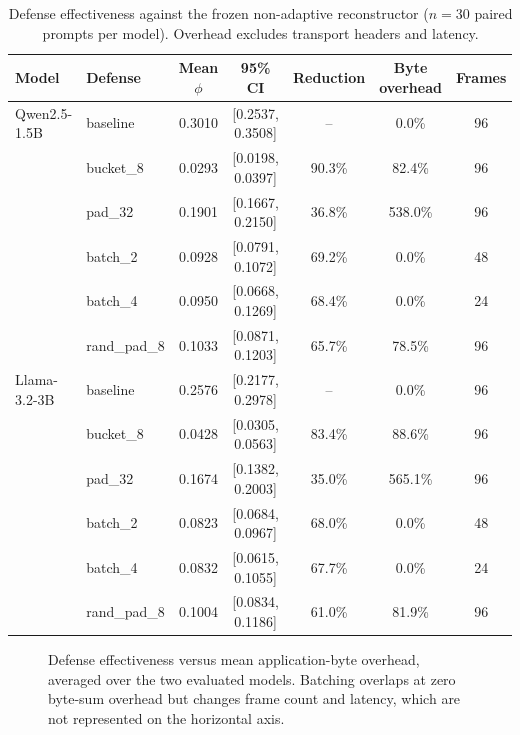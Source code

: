 \documentclass[journal,article,submit,pdftex,moreauthors]{Definitions/mdpi}
\begin{document}
\begin{table}[ht]
\centering
\caption{Defense effectiveness against the frozen non-adaptive reconstructor ($n=30$ paired prompts per model). Overhead excludes transport headers and latency.}
\label{tab:defense_results}
\begin{tabular}{l l c c c c c}
\toprule
Model & Defense & Mean $\phi$ & 95\% CI & Reduction & Byte overhead & Frames \\
\midrule
Qwen2.5-1.5B & baseline & 0.3010 & [0.2537, 0.3508] & -- & 0.0\% & 96 \\
 & bucket\_8 & 0.0293 & [0.0198, 0.0397] & 90.3\% & 82.4\% & 96 \\
 & pad\_32 & 0.1901 & [0.1667, 0.2150] & 36.8\% & 538.0\% & 96 \\
 & batch\_2 & 0.0928 & [0.0791, 0.1072] & 69.2\% & 0.0\% & 48 \\
 & batch\_4 & 0.0950 & [0.0668, 0.1269] & 68.4\% & 0.0\% & 24 \\
 & rand\_pad\_8 & 0.1033 & [0.0871, 0.1203] & 65.7\% & 78.5\% & 96 \\
\midrule
Llama-3.2-3B & baseline & 0.2576 & [0.2177, 0.2978] & -- & 0.0\% & 96 \\
 & bucket\_8 & 0.0428 & [0.0305, 0.0563] & 83.4\% & 88.6\% & 96 \\
 & pad\_32 & 0.1674 & [0.1382, 0.2003] & 35.0\% & 565.1\% & 96 \\
 & batch\_2 & 0.0823 & [0.0684, 0.0967] & 68.0\% & 0.0\% & 48 \\
 & batch\_4 & 0.0832 & [0.0615, 0.1055] & 67.7\% & 0.0\% & 24 \\
 & rand\_pad\_8 & 0.1004 & [0.0834, 0.1186] & 61.0\% & 81.9\% & 96 \\
\bottomrule
\end{tabular}
\end{table}

\begin{figure}[ht]
\centering
{}
\caption{Defense effectiveness versus mean application-byte overhead, averaged over the two evaluated models. Batching overlaps at zero byte-sum overhead but changes frame count and latency, which are not represented on the horizontal axis.}
\label{fig:defense_tradeoff}
\end{figure}
\end{document}
